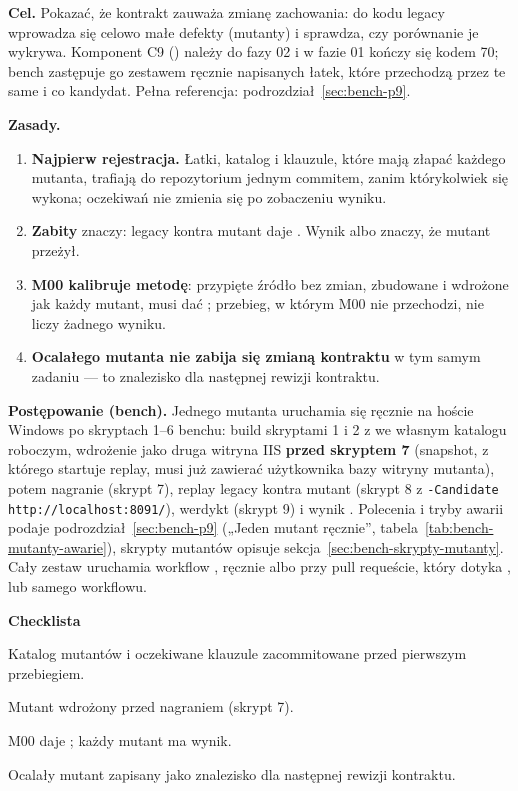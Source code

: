 \textbf{Cel.} Pokazać, że kontrakt zauważa zmianę zachowania: do kodu legacy wprowadza się
celowo małe defekty (mutanty) i sprawdza, czy porównanie je wykrywa. Komponent C9
() należy do fazy 02 i w fazie 01 kończy się kodem 70; bench zastępuje
go zestawem ręcznie napisanych łatek, które przechodzą przez te same 
i  co kandydat. Pełna referencja: podrozdział~\ref{sec:bench-p9}.

\textbf{Zasady.}
\begin{enumerate}
  \item \textbf{Najpierw rejestracja.} Łatki, katalog i klauzule, które mają złapać każdego
        mutanta, trafiają do repozytorium jednym commitem, zanim którykolwiek się wykona;
        oczekiwań nie zmienia się po zobaczeniu wyniku.
  \item \textbf{Zabity} znaczy:  legacy kontra mutant daje
        . Wynik  albo  znaczy, że mutant
        przeżył.
  \item \textbf{M00 kalibruje metodę}: przypięte źródło bez zmian, zbudowane i wdrożone jak
        każdy mutant, musi dać ; przebieg, w którym M00 nie przechodzi, nie
        liczy żadnego wyniku.
  \item \textbf{Ocalałego mutanta nie zabija się zmianą kontraktu} w tym samym zadaniu ---
        to znalezisko dla następnej rewizji kontraktu.
\end{enumerate}

\textbf{Postępowanie (bench).} Jednego mutanta uruchamia się ręcznie na hoście Windows po
skryptach 1--6 benchu: build skryptami 1 i 2 z  we własnym katalogu
roboczym, wdrożenie  jako druga witryna IIS
\textbf{przed skryptem 7} (snapshot, z którego startuje replay, musi już zawierać
użytkownika bazy witryny mutanta), potem nagranie (skrypt 7), replay legacy kontra mutant
(skrypt 8 z \texttt{-Candidate http://localhost:8091/}), werdykt (skrypt 9) i wynik
. Polecenia i tryby awarii podaje
podrozdział~\ref{sec:bench-p9} („Jeden mutant ręcznie”,
tabela~\ref{tab:bench-mutanty-awarie}), skrypty mutantów opisuje
sekcja~\ref{sec:bench-skrypty-mutanty}. Cały zestaw uruchamia workflow ,
ręcznie albo przy pull requeście, który dotyka ,  lub
samego workflowu.

\textbf{Checklista}
\begin{checklista}
  \item Katalog mutantów i oczekiwane klauzule zacommitowane przed pierwszym przebiegiem.
  \item Mutant wdrożony przed nagraniem (skrypt 7).
  \item M00 daje ; każdy mutant ma wynik.
  \item Ocalały mutant zapisany jako znalezisko dla następnej rewizji kontraktu.
\end{checklista}

